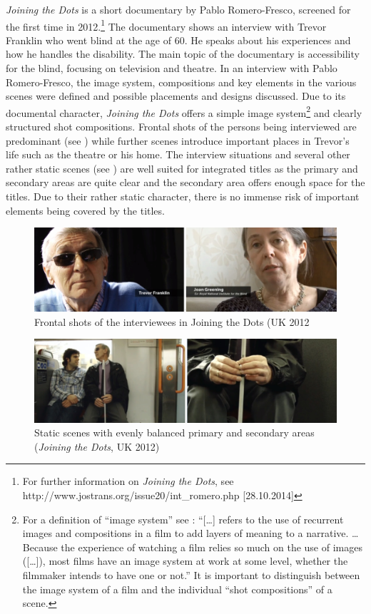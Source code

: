 \documentclass[output=paper]{langsci/langscibook}
\begin{document}
\textit{Joining the Dots} is a short documentary by Pablo Romero-Fresco, screened for the first time in 2012.\footnote{For further information on \textit{Joining the Dots}, see http://www.jostrans.org/issue20/int\_romero.php [28.10.2014]} The documentary shows an interview with Trevor Franklin who went blind at the age of 60. He speaks about his experiences and how he handles the disability. The main topic of the documentary is accessibility for the blind, focusing on television and theatre. In an interview with Pablo Romero-Fresco, the image system, compositions and key elements in the various scenes were defined and possible placements and designs discussed. Due to its documental character, \textit{Joining the Dots} offers a simple image system\footnote{For a definition of ``image system'' see \citet[21]{mercado2010}: ``[\ldots] refers to the use of recurrent images and compositions in a film to add layers of meaning to a narrative. \ldots Because the experience of watching a film relies so much on the use of images ([\ldots]), most films have an image system at work at some level, whether the filmmaker intends to have one or not.'' It is important to distinguish between the image system of a film and the individual ``shot compositions'' of a scene.} and clearly structured shot compositions. Frontal shots of the persons being interviewed are predominant (see ) while further scenes introduce important places in Trevor's life such as the theatre or his home. The interview situations and several other rather static scenes (see ) are well suited for integrated titles as the primary and secondary areas are quite clear and the secondary area offers enough space for the titles. Due to their rather static character, there is no immense risk of important elements being covered by the titles.


\begin{figure}
 \includegraphics[width=\textwidth]{figures/Fox1.png}
 \caption{Frontal shots of the interviewees in Joining the Dots (UK 2012}
  \label{fox:fig:1}
\end{figure}  

\begin{figure}
 \includegraphics[width=\textwidth]{figures/Fox2.png}
 \caption{Static scenes with evenly balanced primary and secondary areas (\textit{Joining the Dots}, UK 2012)}
 \label{fox:fig:2}
\end{figure} 
\end{document}
